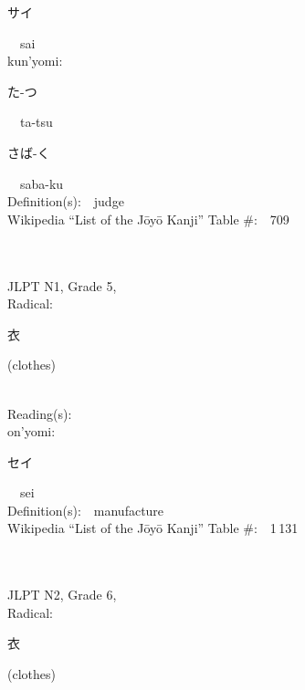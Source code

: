\begin{multicols}{2}
{\hspace*{2em}}{\begin{CJK}{UTF8}{min} サイ \end{CJK}}\ \ sai\ \ \\
{\hspace*{1em}}kun'yomi:\ \ \\
{\hspace*{2em}}{\begin{CJK}{UTF8}{min} た-つ \end{CJK}}\ \ ta-tsu\ \ \\
{\hspace*{2em}}{\begin{CJK}{UTF8}{min} さば-く \end{CJK}}\ \ saba-ku\ \ \\
Definition(s):\ \ judge \\
Wikipedia ``List of the J\=oy\=o Kanji'' Table \#:\ \ 709 \\
\ \ \\
{\fontsize{34pt}{40pt}  }\ \ \\  %
{JLPT N1, Grade 5, \\Radical:\ \ {\begin{CJK}{UTF8}{min} 衣 \end{CJK}} (clothes) } \\
Reading(s):\ \ \\
{\hspace*{1em}}on'yomi:\ \ \\
{\hspace*{2em}}{\begin{CJK}{UTF8}{min} セイ \end{CJK}}\ \ sei\ \ \\
Definition(s):\ \ manufacture \\
Wikipedia ``List of the J\=oy\=o Kanji'' Table \#:\ \ 1\,131 \\
\ \ \\
{\fontsize{34pt}{40pt}  }\ \ \\  %
{JLPT N2, Grade 6, \\Radical:\ \ {\begin{CJK}{UTF8}{min} 衣 \end{CJK}} (clothes) } \\

\end{multicols}
